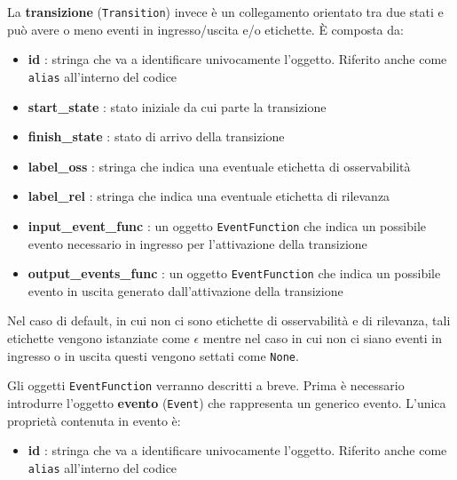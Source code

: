 La \textbf{transizione} (\texttt{Transition}) invece è un collegamento orientato tra due stati e può avere o meno eventi in ingresso/uscita e/o etichette. È composta da: 
\begin{itemize}
    \item \textbf{id} : stringa che va a identificare univocamente l'oggetto. Riferito anche come \texttt{alias} all'interno del codice
    \item \textbf{start\_state} : stato iniziale da cui parte la transizione
    \item \textbf{finish\_state} : stato di arrivo della transizione
    \item \textbf{label\_oss} : stringa che indica una eventuale etichetta di osservabilità
    \item \textbf{label\_rel} : stringa che indica una eventuale etichetta di rilevanza
    \item \textbf{input\_event\_func} : un oggetto \texttt{EventFunction} che indica un possibile evento necessario in ingresso per l'attivazione della transizione
    \item \textbf{output\_events\_func} : un oggetto \texttt{EventFunction} che indica un possibile evento in uscita generato dall'attivazione della transizione
\end{itemize}
Nel caso di default, in cui non ci sono etichette di osservabilità e di rilevanza, tali etichette vengono istanziate come \(\epsilon\) mentre nel caso in cui non ci siano eventi in ingresso o in uscita questi vengono settati come \texttt{None}. \newline

Gli oggetti \texttt{EventFunction} verranno descritti a breve. Prima è necessario introdurre l'oggetto \textbf{evento} (\texttt{Event}) che rappresenta un generico evento. L'unica proprietà contenuta in evento è:
\begin{itemize}
    \item \textbf{id} : stringa che va a identificare univocamente l'oggetto. Riferito anche come \texttt{alias} all'interno del codice
\end{itemize}

